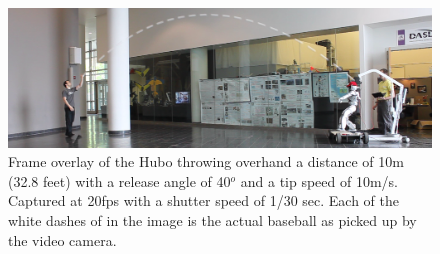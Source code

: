 \begin{figure}[t]
  \centering
\includegraphics[width=1.0\textwidth]{./pix/preThrow2.png}
  \caption{Frame overlay of the Hubo throwing overhand a distance of 10m (32.8 feet) with a release angle of 40$^o$ and a tip speed of 10m/s.  Captured at 20fps with a shutter speed of 1/30 sec.  Each of the white dashes of in the image is the actual baseball as picked up by the video camera.}
  \label{fig:hubo-throw-test}
\end{figure}


